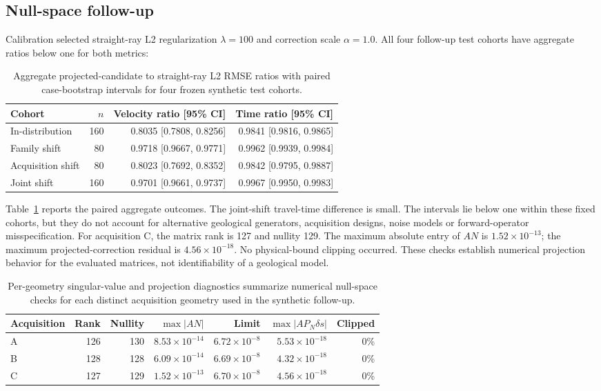 \documentclass[11pt]{article}
\begin{document}
\subsection{Null-space follow-up}
Calibration selected straight-ray L2 regularization $\lambda=100$ and correction scale $\alpha=1.0$. All four follow-up test cohorts have aggregate ratios below one for both metrics:

\begin{table}[htbp]
\centering
\small
\caption{Aggregate projected-candidate to straight-ray L2 RMSE ratios with paired case-bootstrap intervals for four frozen synthetic test cohorts.}
\label{tab:nullspace-ratios}
\begin{tabular}{lrrr}
\toprule
Cohort & $n$ & Velocity ratio [95\% CI] & Time ratio [95\% CI] \\
\midrule
In-distribution & 160 & 0.8035 [0.7808, 0.8256] & 0.9841 [0.9816, 0.9865] \\
Family shift & 80 & 0.9718 [0.9667, 0.9771] & 0.9962 [0.9939, 0.9984] \\
Acquisition shift & 80 & 0.8023 [0.7692, 0.8352] & 0.9842 [0.9795, 0.9887] \\
Joint shift & 160 & 0.9701 [0.9661, 0.9737] & 0.9967 [0.9950, 0.9983] \\
\bottomrule
\end{tabular}
\end{table}

Table~\ref{tab:nullspace-ratios} reports the paired aggregate outcomes. The joint-shift travel-time difference is small. The intervals lie below one within these fixed cohorts, but they do not account for alternative geological generators, acquisition designs, noise models or forward-operator misspecification. For acquisition C, the matrix rank is 127 and nullity 129. The maximum absolute entry of $AN$ is $1.52\times10^{-13}$; the maximum projected-correction residual is $4.56\times10^{-18}$. No physical-bound clipping occurred. These checks establish numerical projection behavior for the evaluated matrices, not identifiability of a geological model.

\begin{table}[htbp]
\centering
\caption{Per-geometry singular-value and projection diagnostics summarize numerical null-space checks for each distinct acquisition geometry used in the synthetic follow-up.}
\label{tab:projection-diagnostics}
\begin{tabular}{lrrrrrr}
\toprule
Acquisition & Rank & Nullity & $\max|AN|$ & Limit & $\max|A P_N\delta s|$ & Clipped \\
\midrule
A & 126 & 130 & $8.53\times10^{-14}$ & $6.72\times10^{-8}$ & $5.53\times10^{-18}$ & 0\% \\
B & 128 & 128 & $6.09\times10^{-14}$ & $6.69\times10^{-8}$ & $4.32\times10^{-18}$ & 0\% \\
C & 127 & 129 & $1.52\times10^{-13}$ & $6.70\times10^{-8}$ & $4.56\times10^{-18}$ & 0\% \\
\bottomrule
\end{tabular}
\end{table}
\end{document}
